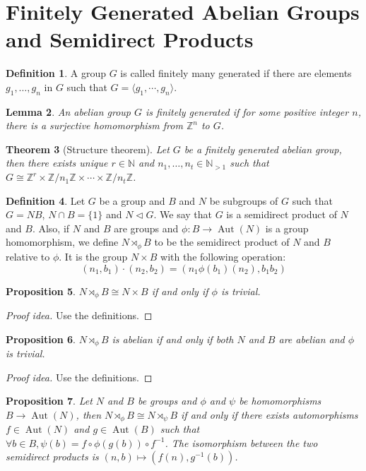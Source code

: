\documentclass[paper=a4, fontsize=12pt]{scrartcl} %
\newtheorem{thm}{Theorem}[section]
\newtheorem{prop}[thm]{Proposition}
\newtheorem{lem}[thm]{Lemma}
\theoremstyle{definition}
\newtheorem{defn}[thm]{Definition}
\theoremstyle{remark}
\newcommand{\N}{\mathbb{N}}
\newcommand{\Z}{\mathbb{Z}}
\DeclareMathOperator{\aut}{Aut}
\numberwithin{equation}{section} %
\numberwithin{figure}{section} %
\numberwithin{table}{section} %
\begin{document}
\section{Finitely Generated Abelian Groups and Semidirect Products}
\begin{defn}
	A group $G$ is called finitely many generated if there are elements $g_1, \dots, g_n$ in $G$ such that $G = \langle g_1, \cdots, g_n\rangle$.
\end{defn}
\begin{lem}
	An abelian group $G$ is finitely generated if for some positive integer $n$, there is a surjective homomorphism from $\Z^n$ to $G$.
\end{lem}
\begin{thm}[Structure theorem]
	Let $G$ be a finitely generated abelian group, then there exists unique $r \in \N$ and $n_1, \dots, n_t \in \N_{> 1}$ such that $G \cong \Z^r \times \Z/n_1\Z \times \cdots \times \Z/n_t\Z$.
\end{thm}
\begin{defn}
	Let $G$ be a group and $B$ and $N$ be subgroups of $G$ such that $G = NB$, $N\cap B = \{1\}$ and $N \lhd G$. We say that $G$ is a semidirect product of $N$ and $B$. Also, if $N$ and $B$ are groups and $\phi: B \rightarrow \aut(N)$ is a group homomorphism, we define $N \rtimes_{\phi} B$ to be the semidirect product of $N$ and $B$ relative to $\phi$. It is the group $N \times B$ with the following operation:
	\[ (n_1,b_1) \cdot (n_2,b_2) = (n_1 \phi(b_1)(n_2), b_1b_2) \]
\end{defn}
\begin{prop}
	$N  \rtimes_{\phi} B \cong N \times B$ if and only if $\phi$ is trivial.
\end{prop}
\begin{proof}[Proof idea]
	Use the definitions.
\end{proof}
\begin{prop}
	$N \rtimes_{\phi} B$ is abelian if and only if both $N$ and $B$ are abelian and $\phi$ is trivial.
\end{prop}
\begin{proof}[Proof idea]
	Use the definitions.
\end{proof}
\begin{prop}\label{prop:iso}
	Let $N$ and $B$ be groups and $\phi$ and $\psi$ be homomorphisms $B \rightarrow \aut(N)$, then $N \rtimes_{\phi} B \cong N \rtimes_{\psi} B$ if and only if there exists automorphisms $f \in \aut(N)$ and $g \in \aut(B)$ such that $\forall b \in B, \psi(b) = f \circ \phi(g(b)) \circ f^{-1}$. The isomorphism between the two semidirect products is $(n,b) \mapsto (f(n), g^{-1}(b))$.
\end{prop}
\end{document}
